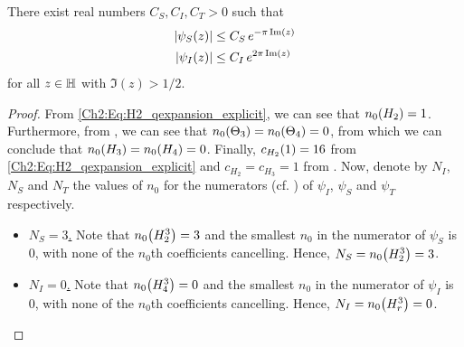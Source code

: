 \begin{boxlemma}\label{Ch4:Lemma:PolyFourierCoeffBound_Apply_b}
    There exist real numbers $C_S, C_I, C_T > 0$ such that
    \begin{align}
        \abs{\psi_S\of{z}} &\leq C_S \, e^{- \pi \Im(z)}
            \label{Ch4:Eq:PolyFourierCoeffBound_psi_S} \\
        \abs{\psi_I\of{z}} &\leq C_I \, e^{2\pi \Im(z)}
            \label{Ch4:Eq:PolyFourierCoeffBound_psi_I} %
    \end{align}
    for all $z \in \mathbb{H}$ with $\Im(z) > 1/2$.
\end{boxlemma}
\begin{proof}
    From \eqref{Ch2:Eq:H2_qexpansion_explicit}, we can see that $n_0\!\left( H_2 \right) = 1$. Furthermore, from , we can see that $n_0\!\left( \Theta_3 \right) = n_0\!\left( \Theta_4 \right) = 0$, from which we can conclude that $n_0\!\left( H_3 \right) = n_0\!\left( H_4 \right) = 0$. Finally, $c_{H_2}\!\left( 1 \right) = 16$ from \eqref{Ch2:Eq:H2_qexpansion_explicit} and $c_{H_2} = c_{H_3} = 1$ from . Now, denote by $N_I$, $N_S$ and $N_T$ the values of $n_0$ for the numerators (cf. ) of $\psi_I$, $\psi_S$ and $\psi_T$ respectively.
    \begin{itemize}
        \item \underline{$N_S = 3$.} Note that $n_0\!\left( H_2^3 \right) = 3$ and the smallest $n_0$ in the numerator of $\psi_S$ is $0$, with none of the $n_0$th coefficients cancelling. Hence, $N_S = n_0\!\left( H_2^3 \right) = 3$. %

        \item \underline{$N_I = 0$.} Note that $n_0\!\left( H_4^3 \right) = 0$ and the smallest $n_0$ in the numerator of $\psi_I$ is $0$, with none of the $n_0$th coefficients cancelling. Hence, $N_I = n_0\!\left( H_r^3 \right) = 0$.
    \end{itemize}
\end{proof}